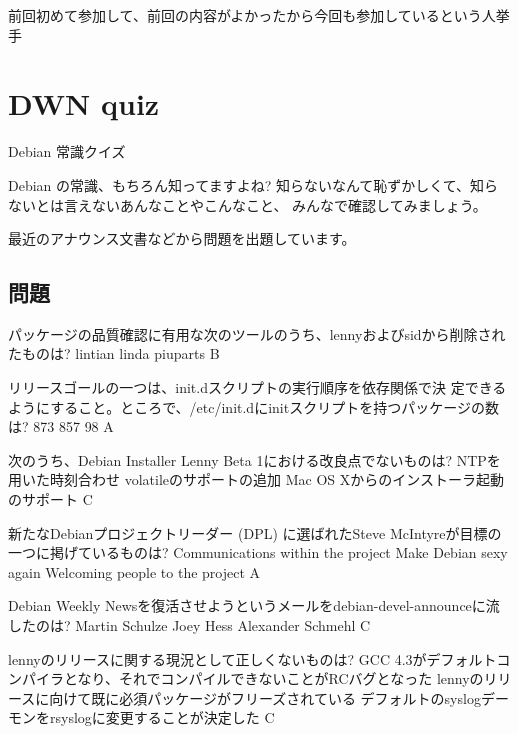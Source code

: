 \documentclass[cjk,dvipdfmx,12pt]{beamer}
\begin{document}
\begin{frame}{}

前回初めて参加して、前回の内容がよかったから今回も参加しているという人挙手
\end{frame}


\section{DWN quiz}
\begin{frame}{Debian 常識クイズ}

Debian の常識、もちろん知ってますよね?
知らないなんて恥ずかしくて、知らないとは言えないあんなことやこんなこと、
みんなで確認してみましょう。

最近のアナウンス文書などから問題を出題しています。

\end{frame}

\subsection{問題}


 \santaku
 {パッケージの品質確認に有用な次のツールのうち、lennyおよびsidから削除されたものは?}
 {lintian}
 {linda}
 {piuparts}
 {B}
 
 \santaku
 {リリースゴールの一つは、init.dスクリプトの実行順序を依存関係で決
 定できるようにすること。ところで、/etc/init.dにinitスクリプトを持つパッケージの数は?}
 {873}%
 {857}%
 {98}%
 {A}
 
 \santaku
 {次のうち、Debian Installer Lenny Beta 1における改良点でないものは?}
 {NTPを用いた時刻合わせ}
 {volatileのサポートの追加}
 {Mac OS Xからのインストーラ起動のサポート}
 {C}
 
 \santaku
 {新たなDebianプロジェクトリーダー (DPL) に選ばれたSteve McIntyreが目標の一つに掲げているものは?}
 {Communications within the project}%
 {Make Debian sexy again}%
 {Welcoming people to the project}%
 {A}
 
 \santaku
 {Debian Weekly Newsを復活させようというメールをdebian-devel-announceに流したのは?}
 {Martin Schulze}
 {Joey Hess}
 {Alexander Schmehl}
 {C}
 
 \santaku
 {lennyのリリースに関する現況として正しくないものは?}
 {GCC 4.3がデフォルトコンパイラとなり、それでコンパイルできないことがRCバグとなった}
 {lennyのリリースに向けて既に必須パッケージがフリーズされている}
 {デフォルトのsyslogデーモンをrsyslogに変更することが決定した}%
 {C}
 
\end{document}
